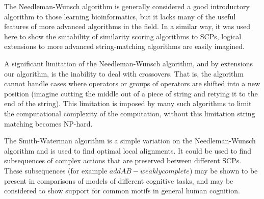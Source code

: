 The Needleman-Wunsch algorithm is generally considered a good introductory algorithm to those learning bioinformatics, but it lacks many of the useful features of more advanced algorithms in the field. In a similar way, it was used here to show the suitability of similarity scoring algorithms to SCPs, logical extensions to more advanced string-matching algorithms are easily imagined.

A significant limitation of the Needleman-Wunsch algorithm, and by extensions our algorithm, is the inability to deal with crossovers. That is, the algorithm cannot handle cases where operators or groups of operators are shifted into a new position (imagine cutting the middle out of a piece of string and retying it to the end of the string). This limitation is imposed by many such algorithms to limit the computational complexity of the computation, without this limitation string matching becomes NP-hard.

The Smith-Waterman algorithm \citep{smith1981identification} is a simple variation on the Needleman-Wunsch algorithm and is used to  find optimal local alignments. It could be used to find subsequences of complex actions that are preserved between different SCPs. These subsequences (for example $addAB - weaklycomplete$) may be shown to be present in comparisons of models of different cognitive tasks, and may be considered to show support for common motifs in general human cognition.

